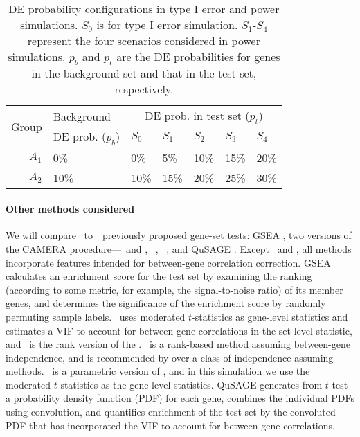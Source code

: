 	
	\begin{table}[!ht]
		\centering
		\caption[DE probability configurations in type I error and power simulations]{DE 
		probability configurations in type I error and power simulations. $S_0$ is for
			type I error simulation. $S_1$-$S_4$ represent the four scenarios considered in power 
			simulations. $p_b$ and $p_t$ are the DE probabilities for genes in the background set 
			and that in the test set, respectively.}		
		\begin{tabular}{rp{3.7cm}p{1.5cm}p{1.5cm}p{1.5cm}p{1.5cm}p{1.5cm}}
			\hline
			\multirow{2}{*}{Group} & 	Background & \multicolumn{5}{c}{DE prob. in test set 
			($p_t$)}\\  \cline{3-7}
			&DE prob. ($p_b$)&$S_0$ &$S_1$ &$S_2$ &$S_3$ &$S_4$\\
		\hline
			$A_1$ & 0\% & 0\%  & 5\% & 10\% & 15\% & 20\%\\ 
			$A_2$ & 10\% & 10\% & 15\%& 20\%& 25\% & 30\%\\  
		\hline
		\end{tabular}	
		\label{table:simusetup}
	\end{table}
	
	
	\paragraph{Other methods considered}
	
	We will compare \OurMethod~to~\HowmanyTest~previously proposed gene-set tests: GSEA
	\citep{subramanian2005gene}, two versions of the CAMERA \citep{wu2012camera} 
	procedure---\CMT~and
	\CMR, \gent~\citep{tian2005discovering}, 
	\genr~\citep{michaud2008integrative}, and QuSAGE \citep{yaari2013quantitative}. Except 
	\gent~and \genr, all methods incorporate features intended for between-gene correlation 
	correction. GSEA calculates an enrichment score for the test set by examining the ranking 
	(according to some metric, for example, the signal-to-noise ratio) of its member genes, and 
	determines the significance of the enrichment
	score by randomly permuting sample labels. \CMT~uses moderated $t$-statistics 
	\citep{Smyth2004moderated} as gene-level statistics and estimates a VIF to account for 
	between-gene correlations in the set-level statistic, and \CMR~is the rank version of the \CMT.
	\genr~is a rank-based method assuming between-gene independence, and is recommended by 
	\citet{tarca2013comparison} over a class of independence-assuming methods. \gent~is a 
	parametric version of \genr, and in this simulation we use the moderated $t$-statistics as the 
	gene-level statistics. 
	QuSAGE generates from $t$-test a probability density function (PDF) for each gene, combines the 
	individual PDFs using convolution, and quantifies enrichment of the test set by the convoluted 
	PDF that has incorporated the VIF to account for between-gene correlations. 
	
